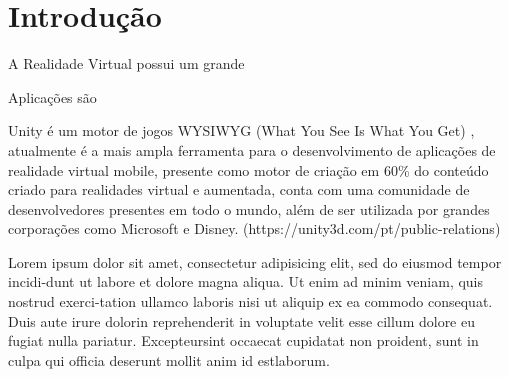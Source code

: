 \section{Introdução}


A Realidade Virtual possui um grande


Aplicações são

Unity é um motor de jogos WYSIWYG (What You See Is What You Get) \cite{sv2015popolin}, atualmente é a mais ampla ferramenta para o desenvolvimento de aplicações de realidade virtual mobile, presente como motor de criação em 60\% do conteúdo criado para realidades virtual e aumentada, conta com uma comunidade de desenvolvedores presentes em todo o mundo, além de ser utilizada por grandes corporações como Microsoft e Disney. (https://unity3d.com/pt/public-relations)


Lorem ipsum dolor sit amet, consectetur adipisicing elit, sed do eiusmod tempor incidi-dunt ut labore et dolore magna aliqua.  Ut enim ad minim veniam, quis nostrud exerci-tation ullamco laboris nisi ut aliquip ex ea commodo consequat.  Duis aute irure dolorin reprehenderit in voluptate velit esse cillum dolore eu fugiat nulla pariatur.  Excepteursint occaecat cupidatat non proident, sunt in culpa qui officia deserunt mollit anim id estlaborum.


